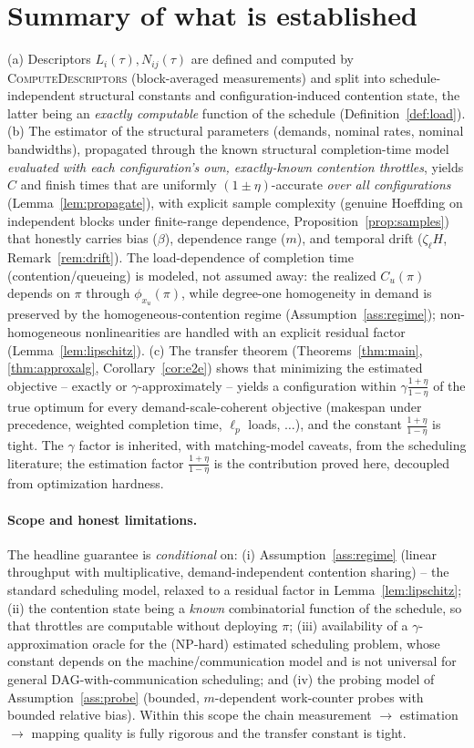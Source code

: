 \documentclass{amsart}
\theoremstyle{definition}
\newcommand{\Chat}{\widehat{C}}
\begin{document}
\section{Summary of what is established}\label{sec:summary}

(a) Descriptors $L_i(\tau),N_{ij}(\tau)$ are defined and computed by
\textsc{ComputeDescriptors} (block-averaged measurements) and split into
schedule-independent structural constants and configuration-induced contention
state, the latter being an \emph{exactly computable} function of the schedule
(Definition~\ref{def:load}). (b) The estimator of the structural parameters
(demands, nominal rates, nominal bandwidths), propagated through the known
structural completion-time model \emph{evaluated with each configuration's own,
exactly-known contention throttles}, yields $\Chat$ and finish times that are
uniformly $(1\pm\eta)$-accurate \emph{over all configurations}
(Lemma~\ref{lem:propagate}), with explicit sample complexity (genuine Hoeffding
on independent blocks under finite-range dependence,
Proposition~\ref{prop:samples}) that honestly carries bias ($\beta$),
dependence range ($m$), and temporal drift ($\zeta_\ell H$,
Remark~\ref{rem:drift}). The load-dependence of completion time
(contention/queueing) is modeled, not assumed away: the realized
$C_u(\pi)$ depends on $\pi$ through $\phi_{x_u}(\pi)$, while degree-one
homogeneity in demand is preserved by the homogeneous-contention regime
(Assumption~\ref{ass:regime}); non-homogeneous nonlinearities are handled with
an explicit residual factor (Lemma~\ref{lem:lipschitz}). (c) The transfer
theorem (Theorems~\ref{thm:main}, \ref{thm:approxalg},
Corollary~\ref{cor:e2e}) shows that minimizing the estimated objective -- exactly
or $\gamma$-approximately -- yields a configuration within
$\gamma\frac{1+\eta}{1-\eta}$ of the true optimum for every
demand-scale-coherent objective (makespan under precedence, weighted completion
time, $\ell_p$ loads, $\dots$), and the constant $\frac{1+\eta}{1-\eta}$ is
tight. The $\gamma$ factor is inherited, with matching-model caveats, from the
scheduling literature; the estimation factor $\frac{1+\eta}{1-\eta}$ is the
contribution proved here, decoupled from optimization hardness.

\paragraph{Scope and honest limitations.} The headline guarantee is
\emph{conditional} on: (i) Assumption~\ref{ass:regime} (linear throughput with
multiplicative, demand-independent contention sharing) -- the standard
scheduling model, relaxed to a residual factor in Lemma~\ref{lem:lipschitz};
(ii) the contention state being a \emph{known} combinatorial function of the
schedule, so that throttles are computable without deploying $\pi$; (iii)
availability of a $\gamma$-approximation oracle for the (NP-hard) estimated
scheduling problem, whose constant depends on the machine/communication model
and is not universal for general DAG-with-communication scheduling; and (iv) the
probing model of Assumption~\ref{ass:probe} (bounded, $m$-dependent
work-counter probes with bounded relative bias). Within this scope the chain
measurement $\to$ estimation $\to$ mapping quality is fully rigorous and the
transfer constant is tight.
\end{document}
